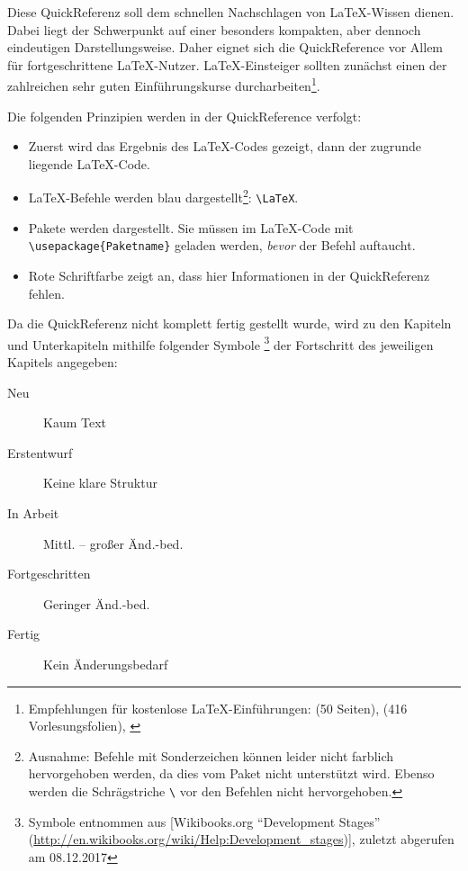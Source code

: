 {}
Diese QuickReferenz soll dem schnellen Nachschlagen von \LaTeX-Wissen dienen.
Dabei liegt der Schwerpunkt auf einer besonders kompakten, aber dennoch eindeutigen Darstellungsweise. 
Daher eignet sich die QuickReference vor Allem für fortgeschrittene \LaTeX-Nutzer.
\LaTeX-Einsteiger sollten zunächst einen der zahlreichen sehr guten Einführungskurse durcharbeiten\footnote{Empfehlungen für kostenlose \LaTeX-Einführungen: \cite{l2kurz} (50 Seiten), \cite{Niebler} (416 Vorlesungsfolien), \cite{Quaritsch}}.


Die folgenden Prinzipien werden in der QuickReference verfolgt: 
\begin{itemize}
	\item Zuerst wird das Ergebnis des \LaTeX-Codes gezeigt, dann der zugrunde liegende \LaTeX-Code.
	\item \LaTeX-Befehle werden blau dargestellt\footnote{Ausnahme: Befehle mit Sonderzeichen können leider nicht farblich hervorgehoben werden, da dies vom Paket  nicht unterstützt wird. 
	Ebenso werden die Schrägstriche  \texttt{\textbackslash} vor den Befehlen nicht hervorgehoben.}:  \lstinline|\LaTeX|.
	\item Pakete werden  dargestellt.
	Sie müssen im \LaTeX-Code mit \newline\lstinline|\usepackage{Paketname}| geladen werden, \emph{bevor} der Befehl \newline\lstinline|| auftaucht.
	\item Rote Schriftfarbe zeigt an, dass hier Informationen in der QuickReferenz fehlen.
\end{itemize}

\columnbreak
\vspace*{1em}

\noindent
Da die QuickReferenz nicht komplett fertig gestellt wurde, wird zu den Kapiteln und Unterkapiteln mithilfe folgender Symbole%
\footnote{Symbole entnommen aus [Wikibooks.org "`Development Stages"' (\url{http://en.wikibooks.org/wiki/Help:Development_stages})], zuletzt abgerufen am 08.12.2017}
 der Fortschritt des jeweiligen Kapitels angegeben:
\begin{description}
	\item[ Neu]  				Kaum Text
	\item[ Erstentwurf]  Keine klare Struktur
	\item[ In Arbeit]		Mittl. -- großer Änd.-bed.
	\item[ Fortgeschritten]	Geringer Änd.-bed.
	\item[ Fertig] 	Kein Änderungsbedarf
\end{description}


